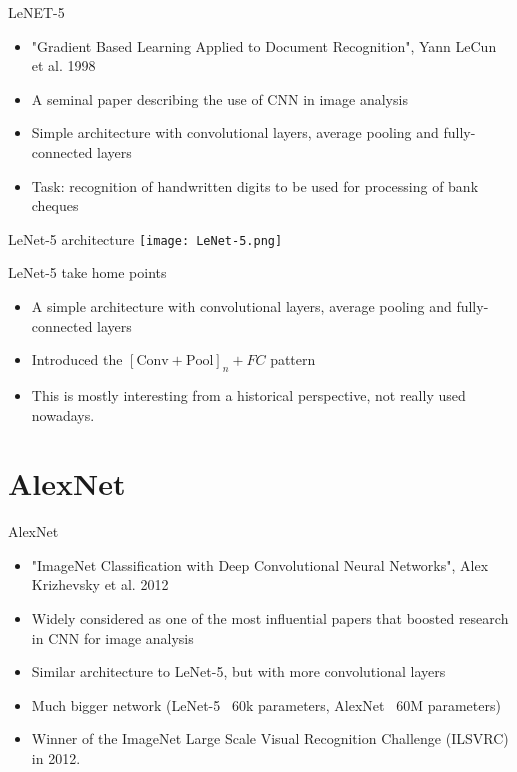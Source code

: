 \documentclass[9pt, aspectratio=169]{beamer}
\begin{document}
\begin{frame}
    {LeNET-5}
    \begin{itemize}
        \item "Gradient Based Learning Applied to Document Recognition", Yann LeCun et al. 1998
        \item A seminal paper describing the use of CNN in image analysis
        \item Simple architecture with convolutional layers, average pooling and fully-connected layers
        \item Task: recognition of handwritten digits to be used for processing of bank cheques
    \end{itemize}
\end{frame}

\begin{frame}
    {LeNet-5 architecture}
    \centering
    \texttt{[image: LeNet-5.png]}
\end{frame}

\begin{frame}
    {LeNet-5 take home points}
    \begin{itemize}
        \item A simple architecture with convolutional layers, average pooling and fully-connected layers
        \item Introduced the $[\text{Conv}+\text{Pool}]_n + FC$ pattern
        \item This is mostly interesting from a historical perspective, not really used nowadays.
    \end{itemize}
\end{frame}

\section{AlexNet}
\begin{frame}
    {AlexNet}
    \begin{itemize}
        \item "ImageNet Classification with Deep Convolutional
              Neural Networks", Alex Krizhevsky et al. 2012
        \item Widely considered as one of the most influential papers that boosted research in CNN for image analysis
        \item Similar architecture to LeNet-5, but with more convolutional layers
        \item Much bigger network (LeNet-5 ~60k parameters, AlexNet ~60M parameters)
        \item Winner of the ImageNet Large Scale Visual Recognition Challenge (ILSVRC) in 2012.
    \end{itemize}
\end{frame}
\end{document}
